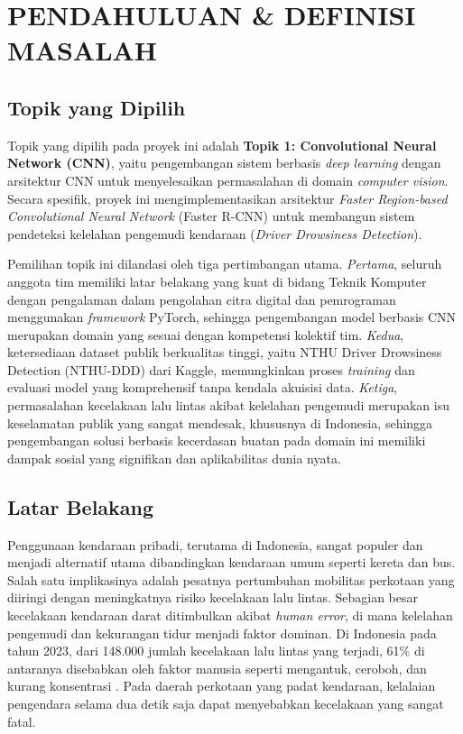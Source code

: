 \documentclass[11pt,a4paper,oneside]{report}
\begin{document}
\chapter{PENDAHULUAN \& DEFINISI MASALAH}
\label{bab:pendahuluan}

\section{Topik yang Dipilih}

Topik yang dipilih pada proyek ini adalah \textbf{Topik 1: Convolutional Neural Network (CNN)}, yaitu pengembangan sistem berbasis \textit{deep learning} dengan arsitektur CNN untuk menyelesaikan permasalahan di domain \textit{computer vision}. Secara spesifik, proyek ini mengimplementasikan arsitektur \textit{Faster Region-based Convolutional Neural Network} (Faster R-CNN) \cite{ren2015faster} untuk membangun sistem pendeteksi kelelahan pengemudi kendaraan (\textit{Driver Drowsiness Detection}).

Pemilihan topik ini dilandasi oleh tiga pertimbangan utama. \textit{Pertama}, seluruh anggota tim memiliki latar belakang yang kuat di bidang Teknik Komputer dengan pengalaman dalam pengolahan citra digital dan pemrograman menggunakan \textit{framework} PyTorch, sehingga pengembangan model berbasis CNN merupakan domain yang sesuai dengan kompetensi kolektif tim. \textit{Kedua}, ketersediaan dataset publik berkualitas tinggi, yaitu NTHU Driver Drowsiness Detection (NTHU-DDD) \cite{weng2017driver} dari Kaggle, memungkinkan proses \textit{training} dan evaluasi model yang komprehensif tanpa kendala akuisisi data. \textit{Ketiga}, permasalahan kecelakaan lalu lintas akibat kelelahan pengemudi merupakan isu keselamatan publik yang sangat mendesak, khususnya di Indonesia, sehingga pengembangan solusi berbasis kecerdasan buatan pada domain ini memiliki dampak sosial yang signifikan dan aplikabilitas dunia nyata.

\section{Latar Belakang}

Penggunaan kendaraan pribadi, terutama di Indonesia, sangat populer dan menjadi alternatif utama dibandingkan kendaraan umum seperti kereta dan bus. Salah satu implikasinya adalah pesatnya pertumbuhan mobilitas perkotaan yang diiringi dengan meningkatnya risiko kecelakaan lalu lintas. Sebagian besar kecelakaan kendaraan darat ditimbulkan akibat \textit{human error}, di mana kelelahan pengemudi dan kekurangan tidur menjadi faktor dominan. Di Indonesia pada tahun 2023, dari 148.000 jumlah kecelakaan lalu lintas yang terjadi, 61\% di antaranya disebabkan oleh faktor manusia seperti mengantuk, ceroboh, dan kurang konsentrasi \cite{goodstats2023}. Pada daerah perkotaan yang padat kendaraan, kelalaian pengendara selama dua detik saja dapat menyebabkan kecelakaan yang sangat fatal.
\end{document}

